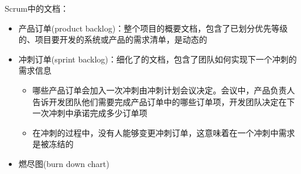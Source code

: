 Scrum中的文档：
\begin{itemize}
    \item 产品订单(product backlog)：整个项目的概要文档，包含了已划分优先等级的、项目要开发的系统或产品的需求清单，是动态的
    \item 冲刺订单(sprint backlog)：细化了的文档，包含了团队如何实现下一个冲刺的需求信息
    \begin{itemize}
        \item 哪些产品订单会加入一次冲刺由冲刺计划会议决定。会议中，产品负责人告诉开发团队他们需要完成产品订单中的哪些订单项，开发团队决定在下一次冲刺中承诺完成多少订单项
        \item 在冲刺的过程中，没有人能够变更冲刺订单，这意味着在一个冲刺中需求是被冻结的
    \end{itemize}
    \item 燃尽图(burn down chart)
\end{itemize}

